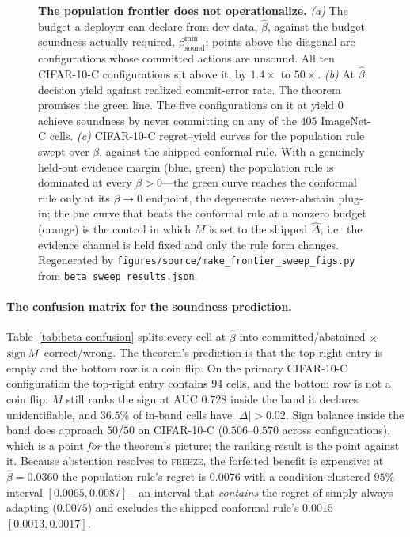 \begin{figure}[t]\centering
{}
\caption{\textbf{The population frontier does not operationalize.}
\emph{(a)} The budget a deployer can declare from dev data, $\widehat\beta$, against the budget
soundness actually required, $\beta^{\min}_{\mathrm{sound}}$; points above the diagonal are
configurations whose committed actions are unsound. All ten CIFAR-10-C configurations sit above it,
by $1.4\times$ to $50\times$.
\emph{(b)} At $\widehat\beta$: decision yield against realized commit-error rate. The theorem
promises the green line. The five configurations on it at yield $0$ achieve soundness by never
committing on any of the $405$ ImageNet-C cells.
\emph{(c)} CIFAR-10-C regret--yield curves for the population rule swept over $\beta$, against the
shipped conformal rule. With a genuinely held-out evidence margin (blue, green) the population rule
is dominated at every $\beta>0$---the green curve reaches the conformal rule only at its
$\beta\!\to\!0$ endpoint, the degenerate never-abstain plug-in; the one curve that beats the
conformal rule at a nonzero budget (orange) is the control in which $M$ is
set to the shipped $\widehat\Delta$, i.e.\ the evidence channel is held fixed and only the rule form
changes. Regenerated by
\texttt{figures/source/make\_frontier\_sweep\_figs.py} from
\texttt{beta\_sweep\_results.json}.}
\label{fig:beta-frontier}
\end{figure}

\paragraph{The confusion matrix for the soundness prediction.} Table~\ref{tab:beta-confusion} splits
every cell at $\widehat\beta$ into committed/abstained $\times$ $\operatorname{sign} M$ correct/wrong. The
theorem's prediction is that the top-right entry is empty and the bottom row is a coin flip. On the
primary CIFAR-10-C configuration the top-right entry contains $94$ cells, and the bottom row is not
a coin flip: $M$ still ranks the sign at AUC $0.728$ inside the band it declares unidentifiable, and
$36.5\%$ of in-band cells have $|\Delta|>0.02$. Sign balance inside the band does approach
$50$/$50$ on CIFAR-10-C ($0.506$--$0.570$ across configurations), which is a point \emph{for} the
theorem's picture; the ranking result is the point against it. Because abstention resolves to
\textsc{freeze}, the forfeited benefit is expensive: at $\widehat\beta=0.0360$ the population rule's
regret is $0.0076$ with a condition-clustered $95\%$ interval $[0.0065,0.0087]$---an interval that
\emph{contains} the regret of simply always adapting ($0.0075$) and excludes the shipped conformal
rule's $0.0015$ $[0.0013,0.0017]$.

